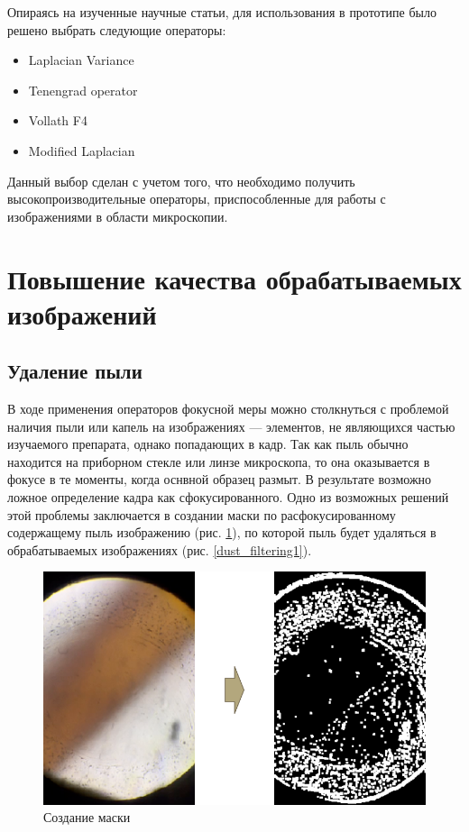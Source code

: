 \documentclass[14pt]{matmex-diploma-custom}
\begin{document}
Опираясь на изученные научные статьи, для использования в прототипе было решено выбрать следующие операторы:
\begin{itemize}
    \item Laplacian Variance 
    \item Tenengrad operator
    \item Vollath F4
    \item Modified Laplacian
\end{itemize}
Данный выбор сделан с учетом того, что необходимо получить высокопроизводительные операторы, приспособленные для работы с изображениями в области микроскопии.

\section{Повышение качества обрабатываемых изображений}
\subsection{Удаление пыли}

В ходе применения операторов фокусной меры можно столкнуться с проблемой наличия пыли или капель на изображениях --- элементов, не являющихся частью изучаемого препарата, однако попадающих в кадр. Так как пыль обычно находится на приборном стекле или линзе микроскопа, то она оказывается в фокусе в те моменты, когда оснвной образец размыт. В результате возможно ложное определение кадра как сфокусированного. Одно из возможных решений этой проблемы заключается в создании  маски по расфокусированному содержащему пыль изображению (рис. \ref{dust_map1}), по которой пыль будет удаляться в обрабатываемых изображениях (рис. \ref{dust_filtering1}).

\begin{figure}[h]
\centering
\includegraphics[width=1.0\textwidth]{figures/dust1.png}
\caption{Создание маски}
\label{dust_map1}
\end{figure}
\end{document}
